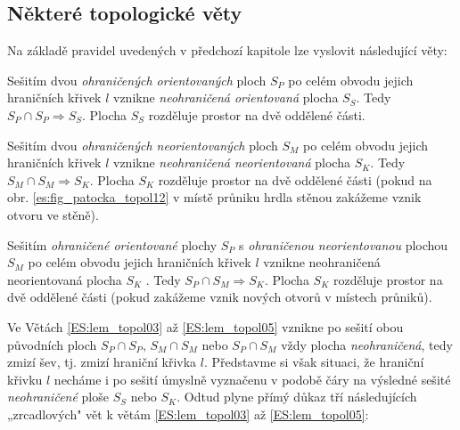     \subsection{Některé topologické věty}\label{teo:IchapIIsecIIsubIII}
      Na základě pravidel uvedených v předchozí kapitole lze vyslovit následující věty:
      \begin{lemma}\label{ES:lem_topol03}
        Sešitím dvou \emph{ohraničených orientovaných} ploch \(S_P\) po celém obvodu jejich 
        hraničních křivek \(l\) vznikne \emph{neohraničená orientovaná} plocha \(S_S\). Tedy 
        \(S_P\cap S_P \Rightarrow S_S\). Plocha \(S_S\) rozděluje prostor na dvě oddělené části.
      \end{lemma}  
    
      \begin{lemma}\label{ES:lem_topol04}
        Sešitím dvou \emph{ohraničených neorientovaných} ploch \(S_M\) po celém obvodu jejich 
        hraničních křivek \(l\) vznikne \emph{neohraničená neorientovaná} plocha \(S_K\).
        Tedy \(S_M\cap S_M \Rightarrow S_K\). Plocha \(S_K\) rozděluje prostor na dvě oddělené 
        části (pokud na obr. \ref{es:fig_patocka_topol12} v místě průniku hrdla stěnou zakážeme 
        vznik otvoru ve stěně).
      \end{lemma} 
      
      \begin{lemma}\label{ES:lem_topol05}
        Sešitím \emph{ohraničené orientované} plochy \(S_P\) s \emph{ohraničenou neorientovanou}
        plochou \(S_M\) po celém obvodu jejich hraničních křivek \(l\) vznikne neohraničená 
        neorientovaná plocha \(S_K\) . Tedy \(S_P\cap S_M \Rightarrow S_K\). Plocha \(S_K\) 
        rozděluje prostor na dvě oddělené části (pokud zakážeme vznik nových otvorů v 
        místech průniků).
      \end{lemma} 
      
      Ve Větách \ref{ES:lem_topol03} až \ref{ES:lem_topol05} vznikne po sešití obou původních ploch 
      \(S_P\cap S_P\), \(S_M\cap S_M\) nebo \(S_P\cap S_M\) vždy plocha \emph{neohraničená}, tedy 
      zmizí šev, tj. zmizí hraniční křivka \(l\). Představme si však situaci, že hraniční křivku 
      \(l\) necháme i po sešití úmyslně vyznačenu v podobě čáry na výsledné sešité 
      \emph{neohraničené} ploše \(S_S\) nebo \(S_K\). Odtud plyne přímý důkaz tří následujících 
      „zrcadlových" vět k větám \ref{ES:lem_topol03} až \ref{ES:lem_topol05}:
    
